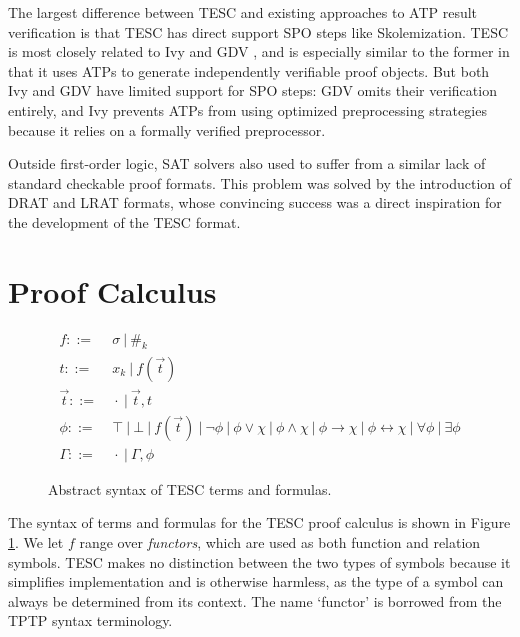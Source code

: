 \documentclass[12pt]{article}
\newcommand{\idf}[1]{\#_{#1}}
\begin{document}
The largest difference between TESC and existing approaches to ATP result verification is that TESC has 
direct support SPO steps like Skolemization. TESC is most closely related to Ivy \cite{mccune2000ivy} 
and GDV \cite{sutcliffe2006semantic}, and is especially similar to the former in that it uses ATPs to 
generate independently verifiable proof objects. But both Ivy and GDV have limited support for SPO steps: 
GDV omits their verification entirely, and Ivy prevents ATPs from using optimized preprocessing strategies 
because it relies on a formally verified preprocessor. 

Outside first-order logic, SAT solvers also used to suffer from a similar lack of standard checkable 
proof formats. This problem was solved by the introduction of DRAT \cite{wetzler2014drat} and LRAT 
\cite{cruz2017efficient} formats, whose convincing success was a direct inspiration for the development 
of the TESC format.



\section{Proof Calculus} \label{sec:proof-calc}

\begin{figure}
  \centering
  \begin{align*}
  f ::= &\ \sigma\ |\ \idf{k}\\
  t ::= &\ x_k\ |\ f(\vec{t})\\
  \vec{t} ::= &\ \cdot\ |\ \vec{t}, t\\
  \phi ::= &\ \top\ |\ \bot\ |\ f(\vec{t})\ |\ \lnot \phi\ |\ \phi \lor \chi\ |\ \phi \land \chi\ |\ \phi \to \chi\ |\ \phi \leftrightarrow \chi\ |\ \forall \phi\ |\ \exists \phi\\
  \Gamma ::= &\ \cdot\ |\ \Gamma, \phi
  \end{align*}
  \caption{Abstract syntax of TESC terms and formulas.}
  \label{fig:abst-syn}
\end{figure}
The syntax of terms and formulas for the TESC proof calculus is shown in Figure \ref{fig:abst-syn}. 
We let $f$ range over \textit{functors}, which are used as both function and relation symbols.
TESC makes no distinction between the two types of symbols because it simplifies implementation 
and is otherwise harmless, as the type of a symbol can always be determined from its context.
The name `functor' is borrowed from the TPTP syntax terminology.
\end{document}
